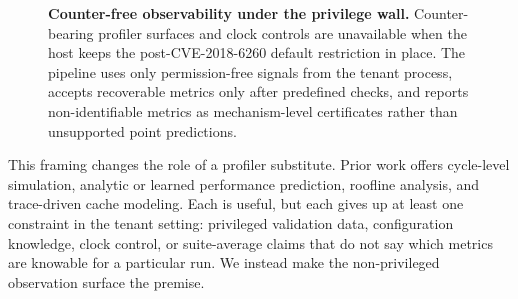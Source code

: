 \documentclass[conference]{IEEEtran}
\newcommand{\nodedetail}[1]{{\color{black!55}#1}}
\begin{document}
\begin{figure}[t]
\caption{\textbf{Counter-free observability under the privilege wall.}
Counter-bearing profiler surfaces and clock controls are unavailable when the
host keeps the post-CVE-2018-6260 default restriction in place. The pipeline
uses only permission-free signals from the tenant process, accepts recoverable
metrics only after predefined checks, and reports non-identifiable
metrics as mechanism-level certificates rather than unsupported point
predictions.}
\label{fig:overview}
\end{figure}

This framing changes the role of a profiler substitute. Prior work offers
cycle-level simulation, analytic or learned performance prediction, roofline
analysis, and trace-driven cache modeling. Each is useful, but each gives up at
least one constraint in the tenant setting: privileged validation data,
configuration knowledge, clock control, or suite-average claims that do not say
which metrics are knowable for a particular run. We instead make the
non-privileged observation surface the premise.
\end{document}
